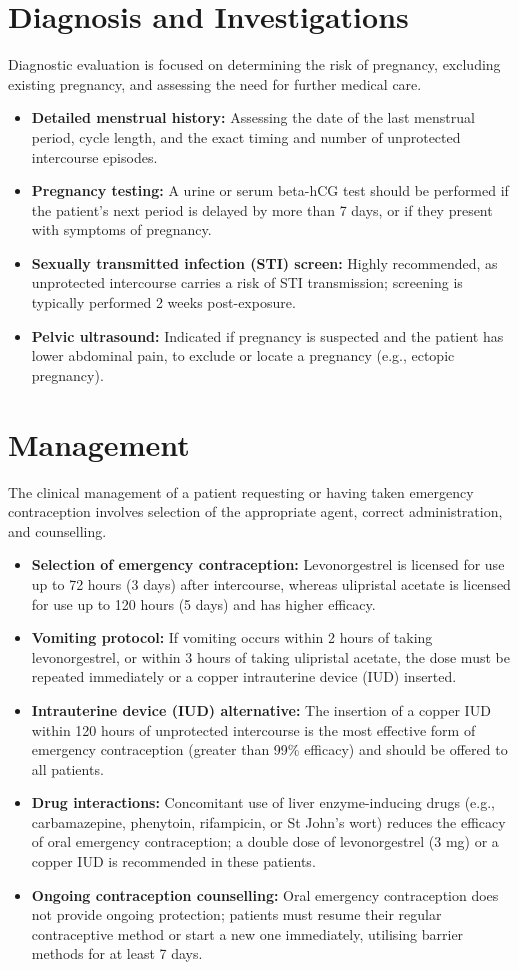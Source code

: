 \section*{Diagnosis and Investigations}
Diagnostic evaluation is focused on determining the risk of pregnancy, excluding existing pregnancy, and assessing the need for further medical care.
\begin{itemize}
    \item \textbf{Detailed menstrual history:} Assessing the date of the last menstrual period, cycle length, and the exact timing and number of unprotected intercourse episodes.
    \item \textbf{Pregnancy testing:} A urine or serum beta-hCG test should be performed if the patient's next period is delayed by more than 7 days, or if they present with symptoms of pregnancy.
    \item \textbf{Sexually transmitted infection (STI) screen:} Highly recommended, as unprotected intercourse carries a risk of STI transmission; screening is typically performed 2 weeks post-exposure.
    \item \textbf{Pelvic ultrasound:} Indicated if pregnancy is suspected and the patient has lower abdominal pain, to exclude or locate a pregnancy (e.g., ectopic pregnancy).
\end{itemize}

\section*{Management}
The clinical management of a patient requesting or having taken emergency contraception involves selection of the appropriate agent, correct administration, and counselling.
\begin{itemize}
    \item \textbf{Selection of emergency contraception:} Levonorgestrel is licensed for use up to 72 hours (3 days) after intercourse, whereas ulipristal acetate is licensed for use up to 120 hours (5 days) and has higher efficacy.
    \item \textbf{Vomiting protocol:} If vomiting occurs within 2 hours of taking levonorgestrel, or within 3 hours of taking ulipristal acetate, the dose must be repeated immediately or a copper intrauterine device (IUD) inserted.
    \item \textbf{Intrauterine device (IUD) alternative:} The insertion of a copper IUD within 120 hours of unprotected intercourse is the most effective form of emergency contraception (greater than 99\% efficacy) and should be offered to all patients.
    \item \textbf{Drug interactions:} Concomitant use of liver enzyme-inducing drugs (e.g., carbamazepine, phenytoin, rifampicin, or St John's wort) reduces the efficacy of oral emergency contraception; a double dose of levonorgestrel (3 mg) or a copper IUD is recommended in these patients.
    \item \textbf{Ongoing contraception counselling:} Oral emergency contraception does not provide ongoing protection; patients must resume their regular contraceptive method or start a new one immediately, utilising barrier methods for at least 7 days.
\end{itemize}

